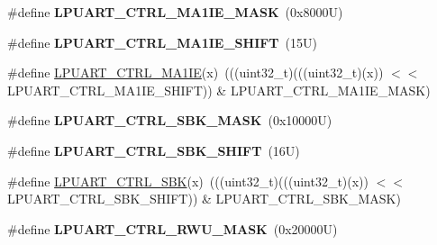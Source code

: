 \begin{DoxyCompactItemize}
\item 
\mbox{\label{group___l_p_u_a_r_t___register___masks_gac06a8e9deffa8b4cc7ade88bfa594d72}} 
\#define {\bfseries L\+P\+U\+A\+R\+T\+\_\+\+C\+T\+R\+L\+\_\+\+M\+A1\+I\+E\+\_\+\+M\+A\+SK}~(0x8000\+U)
\item 
\mbox{\label{group___l_p_u_a_r_t___register___masks_gafc666d11e9bfac2344f798be6e164ebc}} 
\#define {\bfseries L\+P\+U\+A\+R\+T\+\_\+\+C\+T\+R\+L\+\_\+\+M\+A1\+I\+E\+\_\+\+S\+H\+I\+FT}~(15\+U)
\item 
\#define \mbox{\hyperlink{group___l_p_u_a_r_t___register___masks_ga8a7eb99c3eebca90dc2c05843c2ca411}{L\+P\+U\+A\+R\+T\+\_\+\+C\+T\+R\+L\+\_\+\+M\+A1\+IE}}(x)~(((uint32\+\_\+t)(((uint32\+\_\+t)(x)) $<$$<$ L\+P\+U\+A\+R\+T\+\_\+\+C\+T\+R\+L\+\_\+\+M\+A1\+I\+E\+\_\+\+S\+H\+I\+FT)) \& L\+P\+U\+A\+R\+T\+\_\+\+C\+T\+R\+L\+\_\+\+M\+A1\+I\+E\+\_\+\+M\+A\+SK)
\item 
\mbox{\label{group___l_p_u_a_r_t___register___masks_ga3d5242d8ebf3e7a7cf54cb2a598a63d8}} 
\#define {\bfseries L\+P\+U\+A\+R\+T\+\_\+\+C\+T\+R\+L\+\_\+\+S\+B\+K\+\_\+\+M\+A\+SK}~(0x10000\+U)
\item 
\mbox{\label{group___l_p_u_a_r_t___register___masks_gab7db3129b85cfa889187dcc92fe56b96}} 
\#define {\bfseries L\+P\+U\+A\+R\+T\+\_\+\+C\+T\+R\+L\+\_\+\+S\+B\+K\+\_\+\+S\+H\+I\+FT}~(16\+U)
\item 
\#define \mbox{\hyperlink{group___l_p_u_a_r_t___register___masks_ga702c307ab5e7b9a1ab2aff5ad18c0bb3}{L\+P\+U\+A\+R\+T\+\_\+\+C\+T\+R\+L\+\_\+\+S\+BK}}(x)~(((uint32\+\_\+t)(((uint32\+\_\+t)(x)) $<$$<$ L\+P\+U\+A\+R\+T\+\_\+\+C\+T\+R\+L\+\_\+\+S\+B\+K\+\_\+\+S\+H\+I\+FT)) \& L\+P\+U\+A\+R\+T\+\_\+\+C\+T\+R\+L\+\_\+\+S\+B\+K\+\_\+\+M\+A\+SK)
\item 
\mbox{\label{group___l_p_u_a_r_t___register___masks_gafcfbae787cf91414b1b6635557dbcbbe}} 
\#define {\bfseries L\+P\+U\+A\+R\+T\+\_\+\+C\+T\+R\+L\+\_\+\+R\+W\+U\+\_\+\+M\+A\+SK}~(0x20000\+U)
\item 
\mbox{\label{group___l_p_u_a_r_t___register___masks_gafbe6c48f8fe02be76d65e153100f0f41}} 

\end{DoxyCompactItemize}

